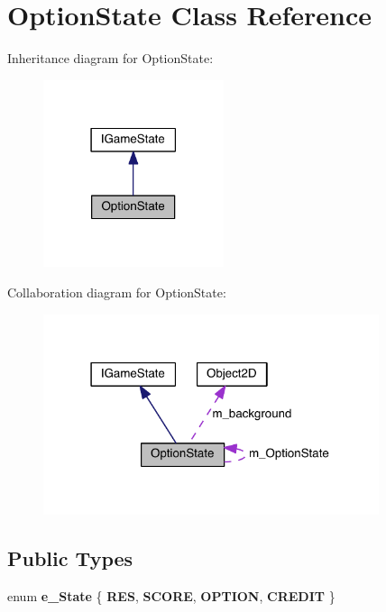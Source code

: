 \hypertarget{class_option_state}{}\section{Option\+State Class Reference}
\label{class_option_state}


Inheritance diagram for Option\+State\+:\nopagebreak
\begin{figure}[H]
\begin{center}
\leavevmode
\includegraphics[width=150pt]{class_option_state__inherit__graph}
\end{center}
\end{figure}


Collaboration diagram for Option\+State\+:\nopagebreak
\begin{figure}[H]
\begin{center}
\leavevmode
\includegraphics[width=279pt]{class_option_state__coll__graph}
\end{center}
\end{figure}
\subsection*{Public Types}
\begin{DoxyCompactItemize}
\item 
\hypertarget{class_option_state_a15dcbe15316a08e8cebb8a1a281a2a92}{}enum {\bfseries e\+\_\+\+State} \{ {\bfseries R\+E\+S}, 
{\bfseries S\+C\+O\+R\+E}, 
{\bfseries O\+P\+T\+I\+O\+N}, 
{\bfseries C\+R\+E\+D\+I\+T}
 \}\label{class_option_state_a15dcbe15316a08e8cebb8a1a281a2a92}

\end{DoxyCompactItemize}
